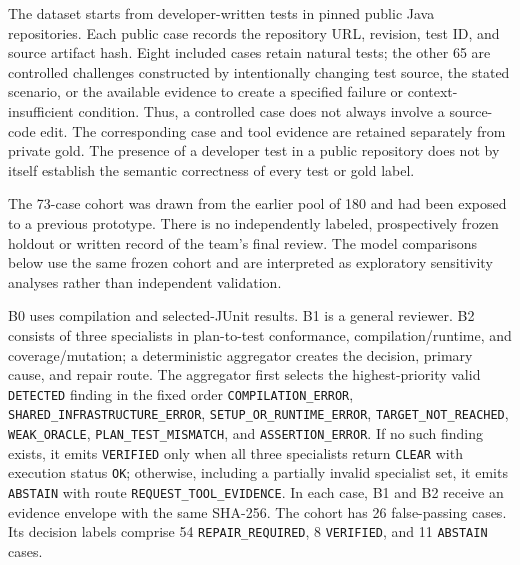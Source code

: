 \documentclass[pdflatex,sn-basic,Numbered,iicol]{sn-jnl}
\begin{document}
The dataset starts from developer-written tests in pinned public Java repositories. Each public case records the repository URL, revision, test ID, and source artifact hash. Eight included cases retain natural tests; the other 65 are controlled challenges constructed by intentionally changing test source, the stated scenario, or the available evidence to create a specified failure or context-insufficient condition. Thus, a controlled case does not always involve a source-code edit. The corresponding case and tool evidence are retained separately from private gold. The presence of a developer test in a public repository does not by itself establish the semantic correctness of every test or gold label.

The 73-case cohort was drawn from the earlier pool of 180 and had been exposed to a previous prototype. There is no independently labeled, prospectively frozen holdout or written record of the team's final review. The model comparisons below use the same frozen cohort and are interpreted as exploratory sensitivity analyses rather than independent validation.

B0 uses compilation and selected-JUnit results. B1 is a general reviewer. B2 consists of three specialists in plan-to-test conformance, compilation/runtime, and coverage/mutation; a deterministic aggregator creates the decision, primary cause, and repair route. The aggregator first selects the highest-priority valid \texttt{DETECTED} finding in the fixed order \texttt{COMPILATION\_ERROR}, \texttt{SHARED\_INFRASTRUCTURE\_ERROR}, \texttt{SETUP\_OR\_RUNTIME\_ERROR}, \texttt{TARGET\_NOT\_REACHED}, \texttt{WEAK\_ORACLE}, \texttt{PLAN\_TEST\_MISMATCH}, and \texttt{ASSERTION\_ERROR}. If no such finding exists, it emits \texttt{VERIFIED} only when all three specialists return \texttt{CLEAR} with execution status \texttt{OK}; otherwise, including a partially invalid specialist set, it emits \texttt{ABSTAIN} with route \texttt{REQUEST\_TOOL\_EVIDENCE}. In each case, B1 and B2 receive an evidence envelope with the same SHA-256. The cohort has 26 false-passing cases. Its decision labels comprise 54 \texttt{REPAIR\_REQUIRED}, 8 \texttt{VERIFIED}, and 11 \texttt{ABSTAIN} cases.
\end{document}
